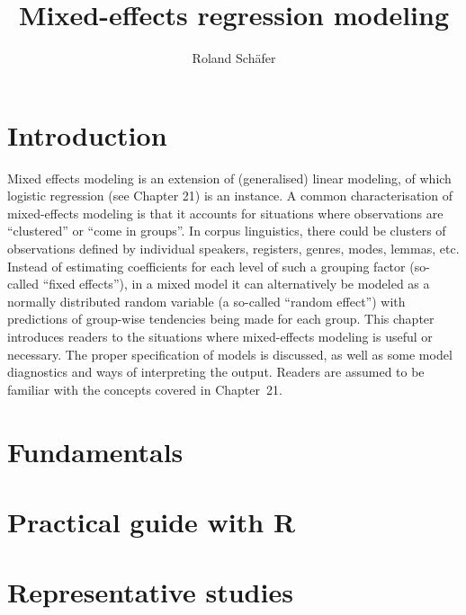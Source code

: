 \documentclass[graybox]{svmult}
\title{Mixed-effects regression modeling}
\author{Roland Schäfer}
\institute{Roland Schäfer \at Deutsche und niederländische Philologie, Freie Universität Berlin \email{roland.schaefer@fu-berlin.de}}
\begin{document}
       

\setcounter{chapter}{21}
\renewcommand*\thesection{\arabic{section}}

\maketitle

\section{Introduction}
\label{sec:introduction}

Mixed effects modeling is an extension of (generalised) linear modeling, of which logistic regression (see Chapter 21) is an instance.
A common characterisation of mixed-effects modeling is that it accounts for situations where observations are ``clustered'' or ``come in groups''.
In corpus linguistics, there could be clusters of observations defined by individual speakers, registers, genres, modes, lemmas, etc.
Instead of estimating coefficients for each level of such a grouping factor (so-called ``fixed effects''), in a mixed model it can alternatively be modeled as a normally distributed random variable (a so-called ``random effect'') with predictions of group-wise tendencies being made for each group.
This chapter introduces readers to the situations where mixed-effects modeling is useful or necessary.
The proper specification of models is discussed, as well as some model diagnostics and ways of interpreting the output.
Readers are assumed to be familiar with the concepts covered in Chapter~21.

\section{Fundamentals}
\label{sec:fundamentals}




\section{Practical guide with R}
\label{sec:practicalguidewithr}



\newpage
\section{Representative studies}
\end{document}
